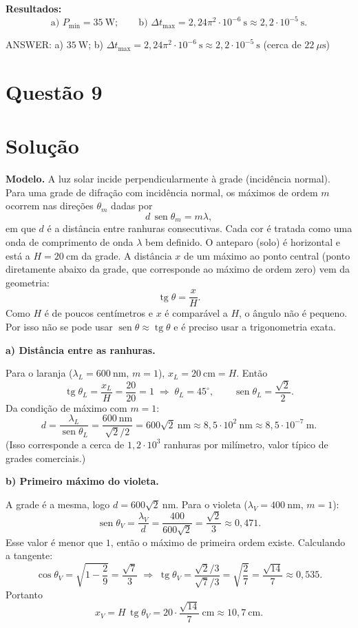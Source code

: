 \documentclass{article}%
\begin{document}
\textbf{Resultados:}
\[
\text{a) } P_{\min}=35\ \mathrm{W};\qquad \text{b) } \Delta t_{\max}=2{,}24\pi^{2}\cdot10^{-6}\ \mathrm{s}\approx 2{,}2\cdot 10^{-5}\ \mathrm{s}.
\]

ANSWER: a) $35\ \mathrm{W}$; b) $\Delta t_{\max}=2{,}24\pi^{2}\cdot 10^{-6}\ \mathrm{s}\approx 2{,}2\cdot10^{-5}\ \mathrm{s}$ (cerca de $22\ \mu\mathrm{s}$)%
\newpage%
\section*{Questão 9}

\section*{Solução}

\textbf{Modelo.} A luz solar incide perpendicularmente à grade (incidência normal). Para uma grade de difração com incidência normal, os máximos de ordem $m$ ocorrem nas direções $\theta_m$ dadas por
\[
d\,\operatorname{sen}\theta_m = m\lambda ,
\]
em que $d$ é a distância entre ranhuras consecutivas. Cada cor é tratada como uma onda de comprimento de onda $\lambda$ bem definido. O anteparo (solo) é horizontal e está a $H = 20\ \mathrm{cm}$ da grade. A distância $x$ de um máximo ao ponto central (ponto diretamente abaixo da grade, que corresponde ao máximo de ordem zero) vem da geometria:
\[
\operatorname{tg}\theta = \frac{x}{H}.
\]
Como $H$ é de poucos centímetros e $x$ é comparável a $H$, o ângulo não é pequeno. Por isso não se pode usar $\operatorname{sen}\theta \approx \operatorname{tg}\theta$ e é preciso usar a trigonometria exata.

\medskip
\textbf{a) Distância entre as ranhuras.}

Para o laranja ($\lambda_L = 600\ \mathrm{nm}$, $m=1$), $x_L = 20\ \mathrm{cm} = H$. Então
\[
\operatorname{tg}\theta_L = \frac{x_L}{H} = \frac{20}{20} = 1 \;\Rightarrow\; \theta_L = 45^\circ ,
\qquad \operatorname{sen}\theta_L = \frac{\sqrt2}{2}.
\]
Da condição de máximo com $m=1$:
\[
d = \frac{\lambda_L}{\operatorname{sen}\theta_L} = \frac{600\ \mathrm{nm}}{\sqrt2/2} = 600\sqrt2\ \mathrm{nm}
\approx 8{,}5\cdot 10^{2}\ \mathrm{nm} \approx 8{,}5\cdot 10^{-7}\ \mathrm{m}.
\]
(Isso corresponde a cerca de $1{,}2\cdot 10^{3}$ ranhuras por milímetro, valor típico de grades comerciais.)

\medskip
\textbf{b) Primeiro máximo do violeta.}

A grade é a mesma, logo $d = 600\sqrt2\ \mathrm{nm}$. Para o violeta ($\lambda_V = 400\ \mathrm{nm}$, $m=1$):
\[
\operatorname{sen}\theta_V = \frac{\lambda_V}{d} = \frac{400}{600\sqrt2} = \frac{\sqrt2}{3}\approx 0{,}471 .
\]
Esse valor é menor que $1$, então o máximo de primeira ordem existe. Calculando a tangente:
\[
\cos\theta_V = \sqrt{1-\frac{2}{9}} = \frac{\sqrt7}{3}
\;\Rightarrow\;
\operatorname{tg}\theta_V = \frac{\sqrt2/3}{\sqrt7/3} = \sqrt{\frac{2}{7}} = \frac{\sqrt{14}}{7}\approx 0{,}535 .
\]
Portanto
\[
x_V = H\,\operatorname{tg}\theta_V = 20\cdot\frac{\sqrt{14}}{7}\ \mathrm{cm}\approx 10{,}7\ \mathrm{cm}.
\]
\end{document}
